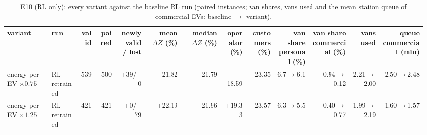 \begin{table}[H]\centering
\scriptsize
\caption{E10 (RL only): every variant against the baseline RL run (paired instances; van shares, vans used and the mean station queue of commercial EVs: baseline $\to$ variant).}\label{tab:expE10}
\begin{adjustbox}{max width=\textwidth}\begin{tabular}{llrrrrrrrrrrr}\toprule
variant & run & valid & paired & \shortstack{newly valid\\/ lost} & \shortstack{mean\\$\Delta Z$ (\%)} & \shortstack{median\\$\Delta Z$ (\%)} & \shortstack{operator\\(\%)} & \shortstack{customers\\(\%)} & \shortstack{van share\\personal (\%)} & \shortstack{van share\\commercial (\%)} & vans used & \shortstack{queue\\commercial (min)} \\ \midrule
energy per EV $\times0.75$ & RL retrained & 539 & 500 & +39/$-$0 & $-$21.82 & $-$21.79 & $-$18.59 & $-$23.35 & 6.7$\to$6.1 & 0.94$\to$0.12 & 2.21$\to$2.00 & 2.50$\to$2.48 \\
energy per EV $\times1.25$ & RL retrained & 421 & 421 & +0/$-$79 & +22.19 & +21.96 & +19.33 & +23.57 & 6.3$\to$5.5 & 0.40$\to$0.77 & 1.99$\to$2.19 & 1.60$\to$1.57 \\
\bottomrule\end{tabular}\end{adjustbox}\end{table}

